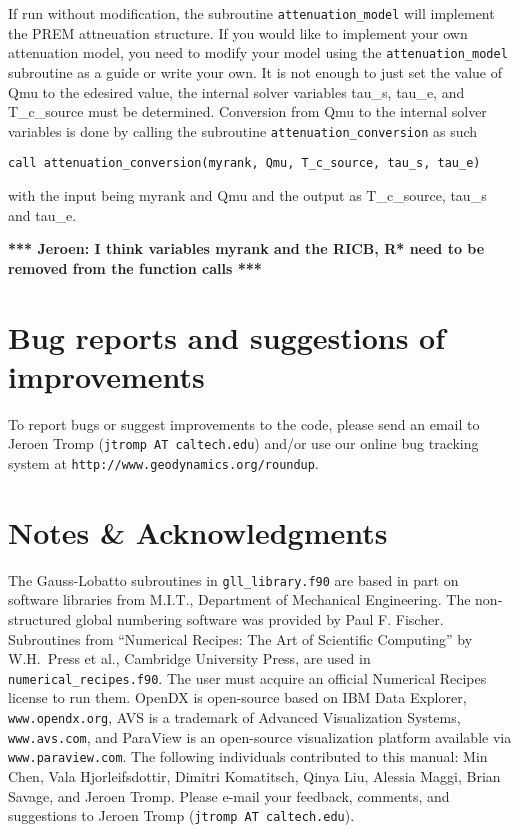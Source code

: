 \documentclass[onecolumn]{article}
\newcommand{\tojeroen}[1]{\textbf{*** Jeroen: #1 ***}}
\begin{document}
If run without modification, the subroutine \texttt{attenuation\_model}
will implement the PREM attneuation
structure.  If you would like to implement your own attenuation model,
you need to modify your model
using the \texttt{attenuation\_model} subroutine as a guide or write
your own.  It is not enough to just set
the value of Qmu to the edesired value, the internal solver variables
tau\_s, tau\_e, and T\_c\_source must be determined.
Conversion from Qmu to the internal solver variables is done by calling
the subroutine \texttt{attenuation\_conversion}
as such
\begin{verbatim}
call attenuation_conversion(myrank, Qmu, T_c_source, tau_s, tau_e)
\end{verbatim}
with the input being myrank and Qmu and the output as T\_c\_source, tau\_s
and tau\_e.

\tojeroen{I think variables myrank and the RICB, R* need to be removed
from the function calls}

\section{Bug reports and suggestions of improvements}

To report bugs or suggest improvements to the code, please send an email
to Jeroen Tromp (\texttt{jtromp AT caltech.edu}) and/or use our online
bug tracking system at \texttt{http://www.geodynamics.org/roundup}.

\section*{Notes \& Acknowledgments}

The Gauss-Lobatto subroutines in \texttt{gll\_library.f90} are based in part on
software libraries from M.I.T., Department of Mechanical Engineering.
The non-structured global numbering software was provided by Paul F. Fischer.
Subroutines from ``Numerical Recipes: The Art of Scientific Computing''
by W.H.\ Press et al., Cambridge University Press, are used in
\texttt{numerical\_recipes.f90}. The user must acquire an official
Numerical Recipes license to run them.
OpenDX is open-source based on IBM Data Explorer, \texttt{www.opendx.org},
AVS is a trademark of Advanced Visualization Systems, \texttt{www.avs.com},
and ParaView is an open-source visualization
platform available via \texttt{www.paraview.com}.
The following individuals contributed to this manual:
Min Chen, Vala Hjorleifsdottir, Dimitri Komatitsch, Qinya Liu,
Alessia Maggi, Brian Savage, and Jeroen Tromp.
Please e-mail your feedback, comments, and suggestions to
Jeroen Tromp (\texttt{jtromp AT caltech.edu}).
\end{document}
